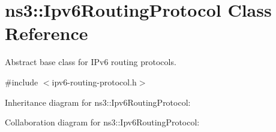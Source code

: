 \hypertarget{classns3_1_1Ipv6RoutingProtocol}{}\section{ns3\+:\+:Ipv6\+Routing\+Protocol Class Reference}
\label{classns3_1_1Ipv6RoutingProtocol}


Abstract base class for I\+Pv6 routing protocols.  




{\ttfamily \#include $<$ipv6-\/routing-\/protocol.\+h$>$}



Inheritance diagram for ns3\+:\+:Ipv6\+Routing\+Protocol\+:


Collaboration diagram for ns3\+:\+:Ipv6\+Routing\+Protocol\+:
